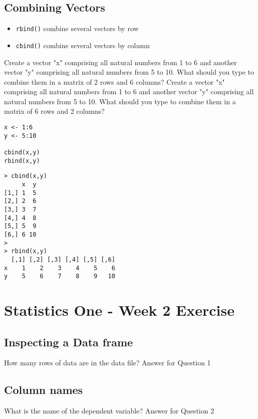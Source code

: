 \documentclass[11pt]{article} %
\begin{document}
\newpage
\subsection{Combining Vectors}

\begin{itemize}
\item \texttt{rbind()} combine several vectors by row
\item \texttt{cbind()}  combine several vectors by column
\end{itemize}

Create a vector "x" comprising all natural numbers from 1 to 6 and another vector "y" comprising all natural numbers from 5 to 10. What should you type to combine them in a matrix of 2 rows and 6 columns?
Create a vector "x" comprising all natural numbers from 1 to 6 and another vector "y" comprising all natural numbers from 5 to 10. What should you type to combine them in a matrix of 6 rows and 2 columns?

\begin{framed}
\begin{verbatim}
x <- 1:6
y <- 5:10

cbind(x,y)
rbind(x,y)
\end{verbatim}
\end{framed}
\begin{verbatim}
> cbind(x,y)
     x  y
[1,] 1  5
[2,] 2  6
[3,] 3  7
[4,] 4  8
[5,] 5  9
[6,] 6 10
>
> rbind(x,y)
  [,1] [,2] [,3] [,4] [,5] [,6]
x    1    2    3    4    5    6
y    5    6    7    8    9   10
\end{verbatim}




\section{Statistics One - Week 2 Exercise}

\subsection{Inspecting a Data frame}
How many rows of data are in the data file?
Answer for Question 1

\subsection{Column names}
What is the name of the dependent variable?
Answer for Question 2
\end{document}
